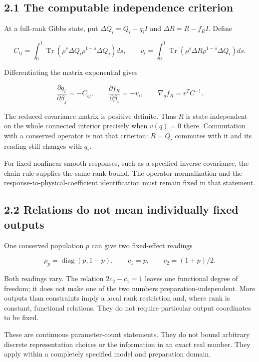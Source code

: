 \documentclass[
  11pt,
  a4paper,
]{article}
\begin{document}
\subsection{2.1 The computable independence criterion}\label{the-computable-independence-criterion}

At a full-rank Gibbs state, put \(\Delta Q_i=Q_i-q_iI\) and \(\Delta R=R-f_RI\). Define

\[C_{ij}=\int_0^1\operatorname{Tr}(\rho^s\Delta Q_i\rho^{1-s}\Delta Q_j)ds,
\qquad
v_i=\int_0^1\operatorname{Tr}(\rho^s\Delta R\rho^{1-s}\Delta Q_i)ds.\]

Differentiating the matrix exponential gives

\[\frac{\partial q_i}{\partial\beta_j}=-C_{ij},\qquad
\frac{\partial f_R}{\partial\beta_i}=-v_i,
\qquad\nabla_q f_R=v^TC^{-1}.\]

The reduced covariance matrix is positive definite. Thus \(R\) is state-independent on the whole connected interior precisely when \(v(q)=0\) there. Commutation with a conserved operator is not that criterion: \(R=Q_i\) commutes with it and its reading still changes with \(q_i\).

For fixed nonlinear smooth responses, such as a specified inverse covariance, the chain rule supplies the same rank bound. The operator normalization and the response-to-physical-coefficient identification must remain fixed in that statement.

\subsection{2.2 Relations do not mean individually fixed outputs}\label{relations-do-not-mean-individually-fixed-outputs}

One conserved population \(p\) can give two fixed-effect readings

\[\rho_p=\operatorname{diag}(p,1-p),\qquad c_1=p,
\qquad c_2=(1+p)/2.\]

Both readings vary. The relation \(2c_2-c_1=1\) leaves one functional degree of freedom; it does not make one of the two numbers preparation-independent. More outputs than constraints imply a local rank restriction and, where rank is constant, functional relations. They do not require particular output coordinates to be fixed.

These are continuous parameter-count statements. They do not bound arbitrary discrete representation choices or the information in an exact real number. They apply within a completely specified model and preparation domain.
\end{document}
